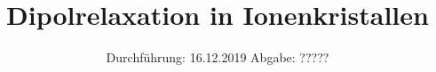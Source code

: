

\subject{V48}
\title{Dipolrelaxation in Ionenkristallen}
\date{%
  Durchführung: 16.12.2019
  \hspace{3em}
  Abgabe: ?????
}



\maketitle
\thispagestyle{empty}
\tableofcontents
\newpage






\printbibliography{}



